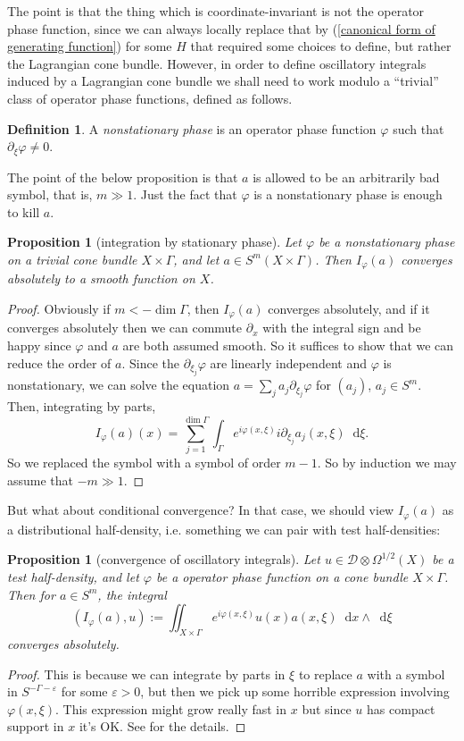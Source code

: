\documentclass[reqno,12pt,letterpaper]{amsart}
\newcommand{\Distr}{\mathscr D}
\newcommand*\dif{\mathop{}\!\mathrm{d}}
\newcommand{\dfn}[1]{\emph{#1}\index{#1}}
\newtheorem{proposition}[theorem]{Proposition}
\theoremstyle{definition}
\newtheorem{definition}[theorem]{Definition}
\numberwithin{equation}{section}
\begin{document}
The point is that the thing which is coordinate-invariant is not the operator phase function, since we can always locally replace that by (\ref{canonical form of generating function}) for some $H$ that required some choices to define, but rather the Lagrangian cone bundle.
However, in order to define oscillatory integrals induced by a Lagrangian cone bundle we shall need to work modulo a ``trivial'' class of operator phase functions, defined as follows.

\begin{definition}
A \dfn{nonstationary phase} is an operator phase function $\varphi$ such that $\partial_\xi \varphi \neq 0$.
\end{definition}

The point of the below proposition is that $a$ is allowed to be an arbitrarily bad symbol, that is, $m \gg 1$.
Just the fact that $\varphi$ is a nonstationary phase is enough to kill $a$.

\begin{proposition}[integration by stationary phase]
Let $\varphi$ be a nonstationary phase on a trivial cone bundle $X \times \Gamma$, and let $a \in S^m(X \times \Gamma)$.
Then $I_\varphi(a)$ converges absolutely to a smooth function on $X$.
\end{proposition}
\begin{proof}
Obviously if $m < -\dim \Gamma$, then $I_\varphi(a)$ converges absolutely, and if it converges absolutely then we can commute $\partial_x$ with the integral sign and be happy since $\varphi$ and $a$ are both assumed smooth.
So it suffices to show that we can reduce the order of $a$.
Since the $\partial_{\xi_j} \varphi$ are linearly independent and $\varphi$ is nonstationary, we can solve the equation $a = \sum_j a_j \partial_{\xi_j} \varphi$ for $(a_j)$, $a_j \in S^m$.
Then, integrating by parts,
$$I_\varphi(a)(x) = \sum_{j=1}^{\dim \Gamma} \int_\Gamma e^{i\varphi(x, \xi)} i\partial_{\xi_j} a_j(x, \xi) \dif \xi.$$
So we replaced the symbol with a symbol of order $m - 1$. So by induction we may assume that $-m \gg 1$.
\end{proof}

But what about conditional convergence?
In that case, we should view $I_\varphi(a)$ as a distributional half-density, i.e. something we can pair with test half-densities:

\begin{proposition}[convergence of oscillatory integrals]
Let $u \in \Distr \otimes \Omega^{1/2}(X)$ be a test half-density, and let $\varphi$ be a operator phase function on a cone bundle $X \times \Gamma$.
Then for $a \in S^m$, the integral
$$(I_\varphi(a), u) := \iint_{X \times \Gamma} e^{i\varphi(x, \xi)} u(x) a(x, \xi) \dif x \wedge \dif \xi$$
converges absolutely.
\end{proposition}
\begin{proof}
This is because we can integrate by parts in $\xi$ to replace $a$ with a symbol in $S^{-\Gamma - \varepsilon}$ for some $\varepsilon > 0$, but then we pick up some horrible expression involving $\varphi(x, \xi)$.
This expression might grow really fast in $x$ but since $u$ has compact support in $x$ it's OK.
See \cite[\S1.2]{HoFIOS1} for the details.
\end{proof}
\end{document}
